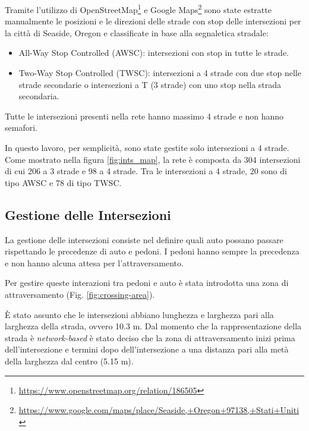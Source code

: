 Tramite l'utilizzo di OpenStreetMap\footnote{\url{https://www.openstreetmap.org/relation/186505}} e Google Maps\footnote{\url{https://www.google.com/maps/place/Seaside,+Oregon+97138,+Stati+Uniti}} sono state estratte manualmente le posizioni e le direzioni delle strade con stop
delle intersezioni per la città di Seaside, Oregon e classificate in base alla segnaletica stradale:

\begin{itemize}
    \item All-Way Stop Controlled (AWSC): intersezioni con stop in tutte le strade.
    \item Two-Way Stop Controlled (TWSC): intersezioni a 4 strade con due stop nelle strade secondarie o intersezioni a T (3 strade) con uno stop nella strada secondaria.
\end{itemize}
Tutte le intersezioni presenti nella rete hanno massimo 4 strade e non hanno semafori.

In questo lavoro, per semplicità, sono state gestite solo intersezioni a 4 strade.
Come mostrato nella figura \ref{fig:ints_map}, la rete è composta da 304 intersezioni
di cui 206 a 3 strade e 98 a 4 strade. Tra le intersezioni a 4 strade, 20 sono di tipo AWSC e 78 di tipo TWSC.

\subsection{Gestione delle Intersezioni}
La gestione delle intersezioni consiste nel definire quali auto possano passare rispettando le precedenze di auto e pedoni.
I pedoni hanno sempre la precedenza e non hanno alcuna attesa per l'attraversamento.

Per gestire queste interazioni tra pedoni e auto è stata introdotta una zona di attraversamento (Fig. \ref{fig:crossing-area}).


È stato assunto che le intersezioni abbiano lunghezza e larghezza pari alla larghezza della strada, ovvero 10.3 m.
Dal momento che la rappresentazione della strada è \textit{network-based} è stato deciso che
la zona di attraversamento inizi prima dell'intersezione e termini dopo dell'intersezione a una distanza pari alla metà della larghezza dal centro (5.15 m).

